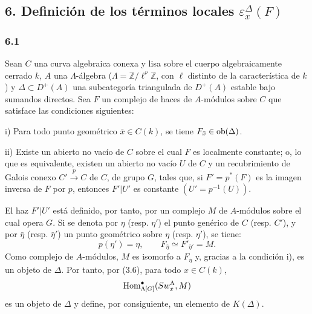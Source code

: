\subsection*{6. Definición de los términos locales $\varepsilon_x^\Delta(F)$}

\subsubsection*{6.1}

Sean $C$ una curva algebraica conexa y lisa sobre el cuerpo algebraicamente cerrado $k$, $A$ una $\Lambda$-álgebra ($\Lambda=\mathbb Z/\ell^\nu\mathbb Z$, con $\ell$ distinto de la característica de $k$) y $\Delta\subset D^+(A)$ una subcategoría triangulada de $D^+(A)$ estable bajo sumandos directos. Sea $F$ un complejo de haces de $A$-módulos sobre $C$ que satisface las condiciones siguientes:

i) Para todo punto geométrico $\bar x\in C(k)$, se tiene $F_{\bar x}\in\operatorname{ob}(\Delta)$.

ii) Existe un abierto no vacío de $C$ sobre el cual $F$ es localmente constante; o, lo que es equivalente, existen un abierto no vacío $U$ de $C$ y un recubrimiento de Galois conexo $C'\xrightarrow{p}C$ de $C$, de grupo $G$, tales que, si $F'=p^*(F)$ es la imagen inversa de $F$ por $p$, entonces $F'|U'$ es constante $(U'=p^{-1}(U))$.

El haz $F'|U'$ está definido, por tanto, por un complejo $M$ de $A$-módulos sobre el cual opera $G$. Si se denota por $\eta$ (resp. $\eta'$) el punto genérico de $C$ (resp. $C'$), y por $\bar\eta$ (resp. $\bar\eta'$) un punto geométrico sobre $\eta$ (resp. $\eta'$), se tiene:
\[
p(\eta')=\eta,\qquad
F_{\bar\eta}\simeq F'_{\bar\eta'}=M.
\tag{6.1.1}
\]
Como complejo de $A$-módulos, $M$ es isomorfo a $F_{\bar\eta}$ y, gracias a la condición i), es un objeto de $\Delta$. Por tanto, por (3.6), para todo $x\in C(k)$,
\[
\operatorname{Hom}^\bullet_{\Lambda[G]}(Sw_x^\Lambda,M)
\]
es un objeto de $\Delta$ y define, por consiguiente, un elemento de $K(\Delta)$.
